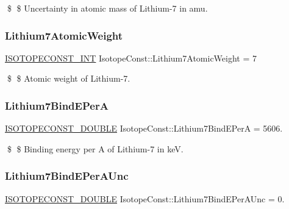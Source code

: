 \$ \$ Uncertainty in atomic mass of Lithium-\/7 in amu. \mbox{\label{group___isotope_const-_lithium-_li7_ga0995fe1d0399c786e44abe17c0c1f6d4}} 
\subsubsection{\texorpdfstring{Lithium7\+Atomic\+Weight}{Lithium7AtomicWeight}}
{\footnotesize\ttfamily \mbox{\hyperlink{group___isotope_const-_macros_ga5f18360b3e99483a35c32d789e62621c}{I\+S\+O\+T\+O\+P\+E\+C\+O\+N\+S\+T\+\_\+\+I\+NT}} Isotope\+Const\+::\+Lithium7\+Atomic\+Weight = 7}

\$ \$ Atomic weight of Lithium-\/7. \mbox{\label{group___isotope_const-_lithium-_li7_ga146f8154e05852a8fba6b7f83e09829c}} 
\subsubsection{\texorpdfstring{Lithium7\+Bind\+E\+PerA}{Lithium7BindEPerA}}
{\footnotesize\ttfamily \mbox{\hyperlink{group___isotope_const-_macros_ga8f45a7272ce02c0b4c65c44636ed719a}{I\+S\+O\+T\+O\+P\+E\+C\+O\+N\+S\+T\+\_\+\+D\+O\+U\+B\+LE}} Isotope\+Const\+::\+Lithium7\+Bind\+E\+PerA = 5606.}

\$ \$ Binding energy per A of Lithium-\/7 in keV. \mbox{\label{group___isotope_const-_lithium-_li7_gacbcb9689bbc3675c6150fa62f7458221}} 
\subsubsection{\texorpdfstring{Lithium7\+Bind\+E\+Per\+A\+Unc}{Lithium7BindEPerAUnc}}
{\footnotesize\ttfamily \mbox{\hyperlink{group___isotope_const-_macros_ga8f45a7272ce02c0b4c65c44636ed719a}{I\+S\+O\+T\+O\+P\+E\+C\+O\+N\+S\+T\+\_\+\+D\+O\+U\+B\+LE}} Isotope\+Const\+::\+Lithium7\+Bind\+E\+Per\+A\+Unc = 0.}

